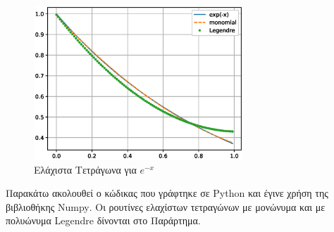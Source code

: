 \documentclass[assignment3.tex]{subfiles}
\begin{document}
\begin{figure}[hp]
\includegraphics[width=0.7\textwidth]{lsquares_3.eps}
\centering
\caption{Ελάχιστα Τετράγωνα για $e^{-x}$}
\label{fig:lsquares_3}
\end{figure}

Παρακάτω ακολουθεί ο κώδικας που γράφτηκε σε \textlatin{Python} και έγινε χρήση της βιβλιοθήκης \textlatin{Numpy}. Οι ρουτίνες ελαχίστων τετραγώνων με μονώνυμα και με πολυώνυμα \textlatin{Legendre} δίνονται στο Παράρτημα.

\end{document}
